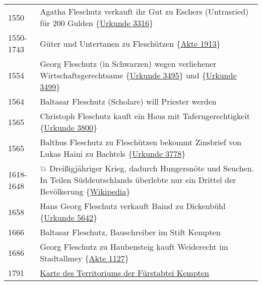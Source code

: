 \documentclass[
]{article}
\begin{document}
\begin{longtable}[]{@{}ll@{}}
1550 & Agatha Fleschutz verkauft ihr Gut zu Eschers (Untrasried) für 200
Gulden \{\href{Quellen/Fuerststift_Kempten/Urkunde_3316}{Urkunde
3316}\} \\
1550-1743 & Güter und Untertanen zu Fleschützen
\{\href{Quellen/Fuerststift_Kempten/Akte_1913}{Akte 1913}\} \\
1554 & Georg Fleschutz (in Schwarzen) wegen verliehener
Wirtschaftsgerechtsame
\{\href{Quellen/Fuerststift_Kempten/Urkunde_3495/}{Urkunde 3495}\} und
\{\href{Quellen/Fuerststift_Kempten/Urkunde_3499}{Urkunde 3499}\} \\
1564 & Baltasar Fleschutz (Scholare) will Priester werden \\
1565 & Christoph Fleschutz kauft ein Haus mit Taferngerechtigkeit
\{\href{Quellen/Fuerststift_Kempten/Urkunde_3800}{Urkunde 3800}\} \\
1565 & Balthus Fleschutz zu Fleschützen bekommt Zinsbrief von Lukas
Haini zu Bachtels
\{\href{Quellen/Fuerststift_Kempten/Urkunde_3778}{Urkunde 3778}\} \\
1618-1648 & 💥 Dreißigjähriger Krieg, dadurch Hungersnöte und Seuchen.
In Teilen Süddeutschlands überlebte nur ein Drittel der Bevölkerung
\{\href{Quellen/Wikipedia/Dreissigjaehriger_Krieg}{Wikipedia}\} \\
1658 & Hans Georg Fleschutz verkauft Baind zu Dickenbühl
\{\href{Quellen/Fuerststift_Kempten/Urkunde_5642/}{Urkunde 5642}\} \\
1666 & Baltasar Fleschutz, Bauschreiber im Stift Kempten \\
1686 & Georg Fleschutz zu Haubensteig kauft Weiderecht im Stadtallmey
\{\href{Quellen/Fuerststift_Kempten/Akte_1127/}{Akte 1127}\} \\
1791 & \href{Quellen/Fuerststift_Kempten/1791_Karte.jpg}{Karte des
Territoriums der Fürstabtei Kempten} \\
\end{longtable}
\end{document}
